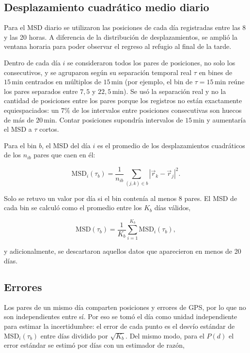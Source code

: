 \subsection{Desplazamiento cuadrático medio diario}

Para el MSD diario se utilizaron las posiciones de cada día registradas entre las 8 y las 20 horas. A diferencia de la distribución de desplazamientos,
se amplió la ventana horaria para poder observar el regreso al refugio al final de la tarde.

Dentro de cada día $i$ se consideraron todos los pares de posiciones, no solo los consecutivos, y se agruparon según su separación temporal real $\tau$ en
bines de $15\,\text{min}$ centrados en múltiplos de $15\,\text{min}$ (por ejemplo, el bin de $\tau = 15\,\text{min}$ reúne los pares separados entre
$7{,}5$ y $22{,}5\,\text{min}$). Se usó la separación real y no la cantidad de posiciones entre los pares porque los registros no están exactamente
equiespaciados: un $7 \%$ de los intervalos entre posiciones consecutivas son huecos de más de $20\,\text{min}$. Contar posiciones supondría intervalos
de $15\,\text{min}$ y aumentaría el MSD a $\tau$ cortos.

Para el bin $b$, el MSD del día $i$ es el promedio de los desplazamientos cuadráticos de los $n_{ib}$ pares que caen en él:

\begin{equation*}
    \mathrm{MSD}_i(\tau_b) = \frac{1}{n_{ib}} \sum_{(j,k)\in b} \left| \vec{r}_k - \vec{r}_j \right|^2 .
\end{equation*}

Solo se retuvo un valor por día si el bin contenía al menos 8 pares. El MSD de cada bin se calculó como el promedio entre los $K_b$ días válidos,

\begin{equation*}
    \mathrm{MSD}(\tau_b) = \frac{1}{K_b} \sum_{i=1}^{K_b} \mathrm{MSD}_i(\tau_b),
\end{equation*}

y adicionalmente, se descartaron aquellos datos que aparecieron en menos de 20 días.

\subsection*{Errores}
Los pares de un mismo día comparten posiciones y errores de GPS, por lo que no son independientes entre sí. Por eso se tomó el día como unidad independiente
para estimar la incertidumbre: el error de cada punto es el desvío estándar de $\mathrm{MSD}_i(\tau_b)$ entre días dividido por $\sqrt{K_b}$. Del mismo modo, 
para el $P(d)$ el error estándar se estimó por días con un estimador de razón,

